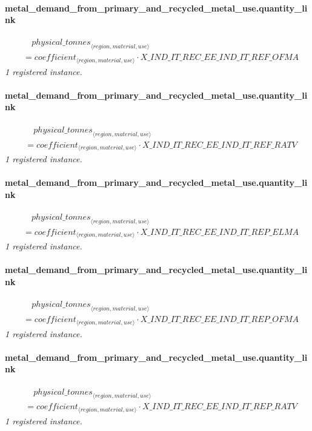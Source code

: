 \documentclass[11pt]{article}
\begin{document}
\paragraph{metal\_demand\_from\_primary\_and\_recycled\_metal\_use.quantity\_link}
\begin{align*}
&\quad {physical\_tonnes}_{\langle region, material, use\rangle}\\
&= coefficient_{\langle region, material, use\rangle} \cdot X\_IND\_IT\_REC\_EE\_IND\_IT\_REF\_OFMA
\end{align*}
\noindent\emph{1 registered instance.}\par
\paragraph{metal\_demand\_from\_primary\_and\_recycled\_metal\_use.quantity\_link}
\begin{align*}
&\quad {physical\_tonnes}_{\langle region, material, use\rangle}\\
&= coefficient_{\langle region, material, use\rangle} \cdot X\_IND\_IT\_REC\_EE\_IND\_IT\_REF\_RATV
\end{align*}
\noindent\emph{1 registered instance.}\par
\paragraph{metal\_demand\_from\_primary\_and\_recycled\_metal\_use.quantity\_link}
\begin{align*}
&\quad {physical\_tonnes}_{\langle region, material, use\rangle}\\
&= coefficient_{\langle region, material, use\rangle} \cdot X\_IND\_IT\_REC\_EE\_IND\_IT\_REP\_ELMA
\end{align*}
\noindent\emph{1 registered instance.}\par
\paragraph{metal\_demand\_from\_primary\_and\_recycled\_metal\_use.quantity\_link}
\begin{align*}
&\quad {physical\_tonnes}_{\langle region, material, use\rangle}\\
&= coefficient_{\langle region, material, use\rangle} \cdot X\_IND\_IT\_REC\_EE\_IND\_IT\_REP\_OFMA
\end{align*}
\noindent\emph{1 registered instance.}\par
\paragraph{metal\_demand\_from\_primary\_and\_recycled\_metal\_use.quantity\_link}
\begin{align*}
&\quad {physical\_tonnes}_{\langle region, material, use\rangle}\\
&= coefficient_{\langle region, material, use\rangle} \cdot X\_IND\_IT\_REC\_EE\_IND\_IT\_REP\_RATV
\end{align*}
\noindent\emph{1 registered instance.}\par
\end{document}
